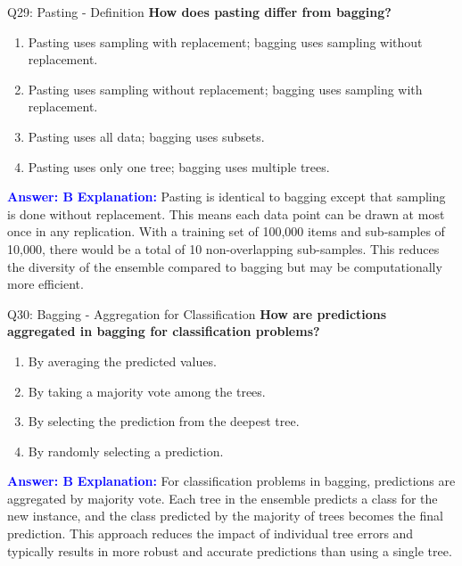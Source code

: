 \documentclass[8pt]{beamer}
\begin{document}
	\begin{frame}{Q29: Pasting - Definition}
		\fontsize{6.5}{7.5}\selectfont
		\textbf{How does pasting differ from bagging?}
		\begin{enumerate}
			\item Pasting uses sampling with replacement; bagging uses sampling without replacement.
			\item Pasting uses sampling without replacement; bagging uses sampling with replacement.
			\item Pasting uses all data; bagging uses subsets.
			\item Pasting uses only one tree; bagging uses multiple trees.
		\end{enumerate}
		\vspace{0.1cm}
		\textcolor{blue}{\textbf{Answer: B}}
		\vspace{0.1cm}
		\textcolor{blue}{\textbf{Explanation:}} Pasting is identical to bagging except that sampling is done without replacement. This means each data point can be drawn at most once in any replication. With a training set of 100,000 items and sub-samples of 10,000, there would be a total of 10 non-overlapping sub-samples. This reduces the diversity of the ensemble compared to bagging but may be computationally more efficient.
	\end{frame}
	
	\begin{frame}{Q30: Bagging - Aggregation for Classification}
		\fontsize{6.5}{7.5}\selectfont
		\textbf{How are predictions aggregated in bagging for classification problems?}
		\begin{enumerate}
			\item By averaging the predicted values.
			\item By taking a majority vote among the trees.
			\item By selecting the prediction from the deepest tree.
			\item By randomly selecting a prediction.
		\end{enumerate}
		\vspace{0.1cm}
		\textcolor{blue}{\textbf{Answer: B}}
		\vspace{0.1cm}
		\textcolor{blue}{\textbf{Explanation:}} For classification problems in bagging, predictions are aggregated by majority vote. Each tree in the ensemble predicts a class for the new instance, and the class predicted by the majority of trees becomes the final prediction. This approach reduces the impact of individual tree errors and typically results in more robust and accurate predictions than using a single tree.
	\end{frame}
	
\end{document}
